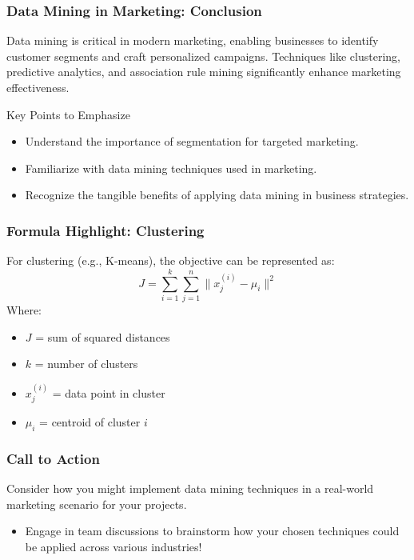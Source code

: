 \documentclass[aspectratio=169]{beamer}
\begin{document}
\begin{frame}[fragile]
    \frametitle{Data Mining in Marketing: Conclusion}
    Data mining is critical in modern marketing, enabling businesses to identify customer segments and craft personalized campaigns. Techniques like clustering, predictive analytics, and association rule mining significantly enhance marketing effectiveness.

    \begin{block}{Key Points to Emphasize}
        \begin{itemize}
            \item Understand the importance of segmentation for targeted marketing.
            \item Familiarize with data mining techniques used in marketing.
            \item Recognize the tangible benefits of applying data mining in business strategies.
        \end{itemize}
    \end{block}
\end{frame}

\begin{frame}[fragile]
    \frametitle{Formula Highlight: Clustering}
    For clustering (e.g., K-means), the objective can be represented as:
    \begin{equation}
        J = \sum_{i=1}^{k} \sum_{j=1}^{n} \| x_j^{(i)} - \mu_i \|^2
    \end{equation}
    Where:
    \begin{itemize}
        \item \( J \) = sum of squared distances
        \item \( k \) = number of clusters
        \item \( x_j^{(i)} \) = data point in cluster
        \item \( \mu_i \) = centroid of cluster \( i \)
    \end{itemize}
\end{frame}

\begin{frame}[fragile]
    \frametitle{Call to Action}
    Consider how you might implement data mining techniques in a real-world marketing scenario for your projects. 
    \begin{itemize}
        \item Engage in team discussions to brainstorm how your chosen techniques could be applied across various industries!
    \end{itemize}
\end{frame}
\end{document}
